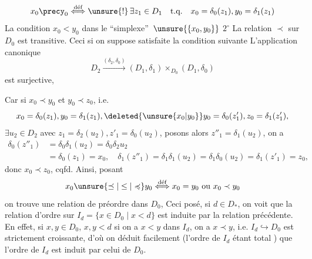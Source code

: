 \[
x_0\precy_0\mathrel{\overset{\text{déf}}{\Longleftrightarrow}}
\unsure{!}\,\exists z_1\in D_1\quad\text{t.q.}\quad x_0=\delta_0(z_1),y_0=\delta_1(z_1)
\]
La condition  $x_0<y_0$ dans le \textquotedblleft simplexe\textquotedblright\ $\unsure{\{x_0,y_0\}}$
\textcircled{$2^{\circ}$} La relation $\prec$  sur $D_0$ est transitive.
Ceci si on suppose satisfaite la condition suivante
 L'application canonique
\[
D_2\xrightarrow{(\delta_2,\delta_0)}(D_1,\delta_1)\mathbin{\times}_{D_0}(D_1,\delta_0)
\]
est surjective,

Car si $x_0\prec y_0$ et $y_0\prec z_0$, i.e.
\[
x_0=\delta_0(z_1),y_0=\delta_1(z_1),\deleted{\unsure{x_0|y_0}}y_0=\delta_0(z'_1),z_0=\delta_1(z'_1),
\]
$\exists u_2\in D_2$ avec $z_1=\delta_2(u_2),z'_1=\delta_0(u_2)$, posons alors $z''_1=\delta_1(u_2)$, on a
\[
\begin{aligned}
\delta_0(z''_1)&=\delta_0\delta_1(u_2)=\delta_0\delta_2u_2\\
&=\delta_0(z_1)=x_0,\quad\delta_1(z''_1)=\delta_1\delta_1(u_2)=\delta_1\delta_0(u_2)=\delta_1(z'_1)=z_0,
\end{aligned}
\]
donc $x_0\prec z_0$, cqfd. 
Ainsi, posant
\[
x_0\unsure{\preceq|\leq|\preccurlyeq} y_0\mathrel{\overset{\text{déf}}{\Longleftrightarrow}}x_0=y_0\ \text{ou}\ x_0\prec y_0
\]
on trouve une relation de préordre dans $D_0$, 
Ceci  posé, si $d\in D_*$, on voit que la relation d'ordre sur $I_d=\{x\in D_0\mid x<d\}$ est induite par la relation précédente. En effet, si $x,y\in D_0$, $x,y<d$ si on a
$x<y$ dans  $I_d$,  on a $x\prec y$, i.e.  $I_d\hookrightarrow D_0$ est strictement croissante, d'où on déduit facilement  (l'ordre de $I_d$ étant total ) que l'ordre de $I_d$ est induit par celui de $D_0$.
